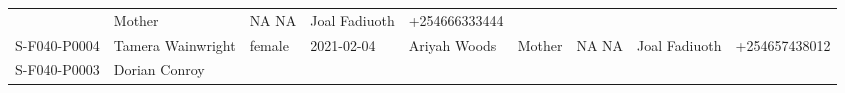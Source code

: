 \documentclass[
]{article}
\begin{document}
\begin{longtable}[]{@{}lllllllll@{}}
\begin{minipage}[t]{0.09\columnwidth}
\end{minipage} & \begin{minipage}[t]{0.20\columnwidth}\raggedright
Mother\strut
\end{minipage} & \begin{minipage}[t]{0.07\columnwidth}\raggedright
NA NA\strut
\end{minipage} & \begin{minipage}[t]{0.07\columnwidth}\raggedright
Joal Fadiuoth\strut
\end{minipage} & \begin{minipage}[t]{0.07\columnwidth}\raggedright
+254666333444\strut
\end{minipage}\tabularnewline
\begin{minipage}[t]{0.07\columnwidth}\raggedright
S-F040-P0004\strut
\end{minipage} & \begin{minipage}[t]{0.09\columnwidth}\raggedright
Tamera Wainwright\strut
\end{minipage} & \begin{minipage}[t]{0.04\columnwidth}\raggedright
female\strut
\end{minipage} & \begin{minipage}[t]{0.06\columnwidth}\raggedright
2021-02-04\strut
\end{minipage} & \begin{minipage}[t]{0.09\columnwidth}\raggedright
Ariyah Woods\strut
\end{minipage} & \begin{minipage}[t]{0.20\columnwidth}\raggedright
Mother\strut
\end{minipage} & \begin{minipage}[t]{0.07\columnwidth}\raggedright
NA NA\strut
\end{minipage} & \begin{minipage}[t]{0.07\columnwidth}\raggedright
Joal Fadiuoth\strut
\end{minipage} & \begin{minipage}[t]{0.07\columnwidth}\raggedright
+254657438012\strut
\end{minipage}\tabularnewline
\begin{minipage}[t]{0.07\columnwidth}\raggedright
S-F040-P0003\strut
\end{minipage} & \begin{minipage}[t]{0.09\columnwidth}\raggedright
Dorian Conroy\strut
\end{minipage} & \begin{minipage}[t]{0.04\columnwidth}\raggedright

\end{minipage}
\end{longtable}
\end{document}
